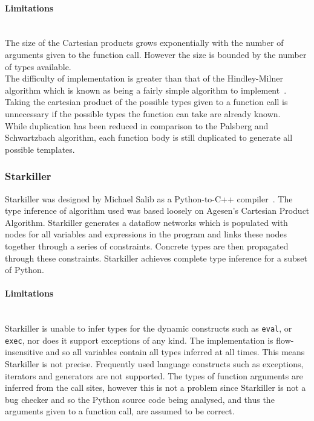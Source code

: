 \documentclass[12pt, titlepage]{article}
\begin{document}
\paragraph*{Limitations}\mbox{}\\
The size of the Cartesian products grows exponentially with the number of arguments given to the function call. However the size is bounded by the number of types available. \\
\indent The difficulty of implementation is greater than that of the Hindley-Milner algorithm which is known as being a fairly simple algorithm to implement~\cite{jones95}. \\
\indent Taking the cartesian product of the possible types given to a function call is unnecessary if the possible types the function can take are already known. \\
\indent While duplication has been reduced in comparison to the Palsberg and Schwartzbach algorithm, each function body is still duplicated to generate all possible templates.

\subsubsection{Starkiller}
Starkiller was designed by Michael Salib as a Python-to-C++ compiler~\cite{starkiller}. The type inference of algorithm used was based loosely on Agesen’s Cartesian Product Algorithm. Starkiller generates a dataflow networks which is populated with nodes for all variables and expressions in the program and links these nodes together through a series of constraints. Concrete types are then propagated through these constraints. Starkiller achieves complete type inference for a subset of Python.
\paragraph*{Limitations}\mbox{}\\
Starkiller is unable to infer types for the dynamic constructs such as \texttt{eval}, or \texttt{exec}, nor does it support exceptions of any kind. The implementation is flow-insensitive and so all variables contain all types inferred at all times. This means Starkiller is not precise. Frequently used language constructs such as exceptions, iterators and generators are not supported. The types of function arguments are inferred from the call sites, however this is not a problem since Starkiller is not a bug checker and so the Python source code being analysed, and thus the arguments given to a function call, are assumed to be correct.
\end{document}
